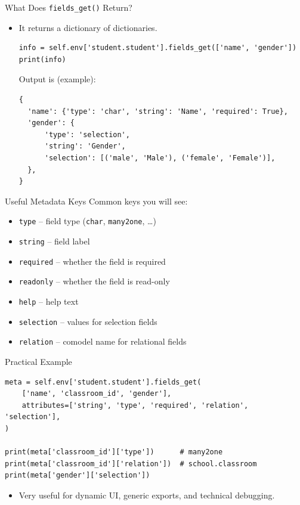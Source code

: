 \begin{frame}[fragile]{What Does \texttt{fields\_get()} Return?}
	\begin{block}{}
		\begin{itemize}
			\item It returns a dictionary of dictionaries.
\begin{lstlisting}
info = self.env['student.student'].fields_get(['name', 'gender'])
print(info)
\end{lstlisting}
			Output is (example):
\begin{lstlisting}
{
  'name': {'type': 'char', 'string': 'Name', 'required': True},
  'gender': {
	  'type': 'selection',
	  'string': 'Gender',
	  'selection': [('male', 'Male'), ('female', 'Female')],
  },
}
\end{lstlisting}
		\end{itemize}
	\end{block}
\end{frame}

\begin{frame}[fragile]{Useful Metadata Keys}
	Common keys you will see:
	\begin{itemize}
		\item \texttt{type} -- field type (\texttt{char}, \texttt{many2one}, \ldots)
		\item \texttt{string} -- field label
		\item \texttt{required} -- whether the field is required
		\item \texttt{readonly} -- whether the field is read-only
		\item \texttt{help} -- help text
		\item \texttt{selection} -- values for selection fields
		\item \texttt{relation} -- comodel name for relational fields
	\end{itemize}
\end{frame}

\begin{frame}[fragile]{Practical Example}
\begin{lstlisting}
meta = self.env['student.student'].fields_get(
	['name', 'classroom_id', 'gender'],
	attributes=['string', 'type', 'required', 'relation', 'selection'],
)

print(meta['classroom_id']['type'])      # many2one
print(meta['classroom_id']['relation'])  # school.classroom
print(meta['gender']['selection'])
\end{lstlisting}
	\begin{itemize}
		\item Very useful for dynamic UI, generic exports, and technical debugging.
	\end{itemize}
\end{frame}

